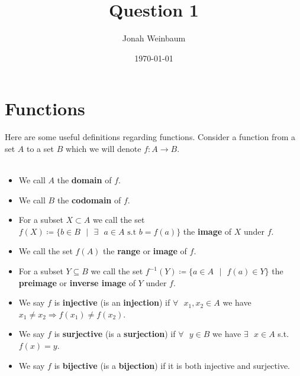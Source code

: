 \documentclass{article}
\begin{document}
\title{Question 1}
\author{Jonah Weinbaum}
\date{\today}
\maketitle

\section{Functions}

Here are some useful definitions regarding functions. Consider a function from a set $A$ to a set $B$ which we will denote $f: A\to B$.
\\\\
\begin{itemize}
\item We call $A$ the \textbf{domain} of $f$.
\item We call $B$ the \textbf{codomain} of $f$.
  \item For a subset $X\subset{A}$ we call the set $f(X) \coloneq \{b\in B \text{ }\vert\text{ }\exists\text{ }a\in{A}\text{ s.t }b=f(a)\}$ the \textbf{image} of $X$ under $f$.
\item We call the set $f(A)$ the \textbf{range} or \textbf{image} of $f$.
\item For a subset $Y\subseteq B$ we call the set $f^{-1}(Y) \coloneq \{a\in A\text{ }\vert\text{ }f(a) \in Y\}$ the \textbf{preimage} or \textbf{inverse image} of $Y$ under $f$.
\item We say $f$ is \textbf{injective} (is an \textbf{injection}) if $\forall\text{ }x_1, x_2\in {A}$ we have $x_1\ne x_2 \Rightarrow f(x_1) \ne f(x_2)$.
\item We say $f$ is \textbf{surjective} (is a \textbf{surjection}) if $\forall\text{ }y\in B$ we have $\exists\text{ }x\in A$ s.t. $f(x) = y$.
  \item We say $f$ is \textbf{bijective} (is a \textbf{bijection}) if it is both injective and surjective.
\end{itemize}
\end{document}
